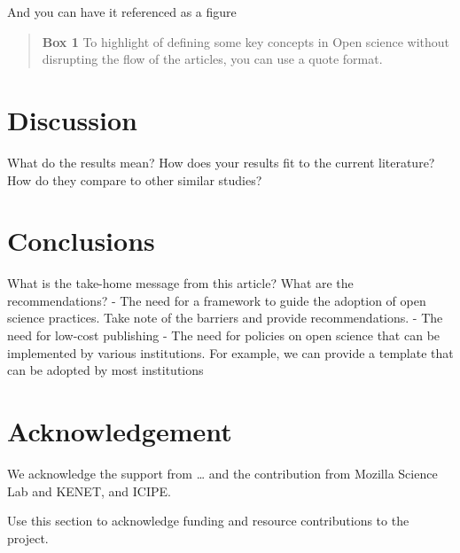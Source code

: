 And you can have it referenced as a figure

\begin{quote}
\textbf{Box 1} To highlight of defining some key concepts in Open
science without disrupting the flow of the articles, you can use a quote
format.
\end{quote}

\section*{Discussion}\label{discussion}

What do the results mean? How does your results fit to the current
literature? How do they compare to other similar studies?

\section*{Conclusions}\label{conclusions}

What is the take-home message from this article? What are the
recommendations? - The need for a framework to guide the adoption of
open science practices. Take note of the barriers and provide
recommendations. - The need for low-cost publishing - The need for
policies on open science that can be implemented by various
institutions. For example, we can provide a template that can be adopted
by most institutions

\section{Acknowledgement}\label{acknowledgement}

We acknowledge the support from \ldots{} and the contribution from
Mozilla Science Lab and KENET, and ICIPE.

Use this section to acknowledge funding and resource contributions to
the project.
